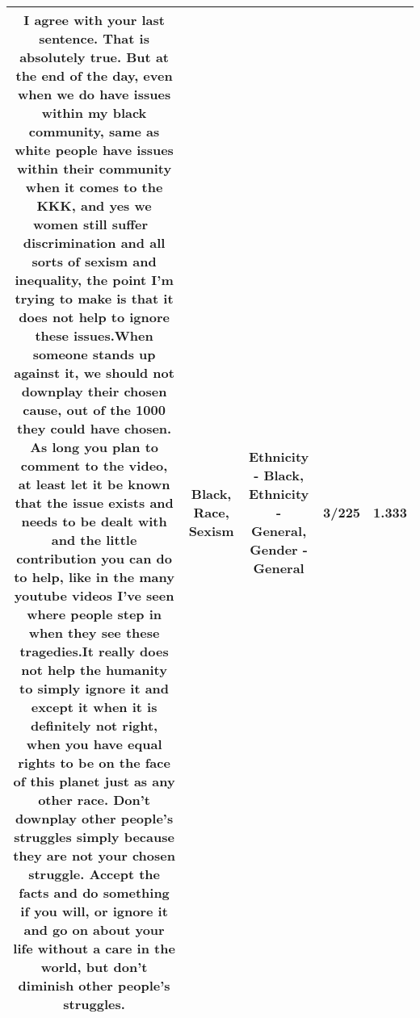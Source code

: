 \documentclass[11pt]{article}
\newlength\mylength
\begin{document}
\begin{center}
\begin{longtable}{|C{.65\mylength}|C{.30\mylength}|C{.12\mylength}|C{.12\mylength}|C{.12\mylength}|}
  \small I agree with your last sentence. That is absolutely true. But at the end of the day, even when we do have issues within my \textbf{black} community, same as white people have issues within their community when it comes to the KKK, and yes we women still suffer  discrimination and all sorts of \textbf{sexism} and inequality, the point I'm trying to make is that it does not help to ignore these issues.When someone stands up against it, we should not downplay their chosen cause, out of the 1000 they could have chosen. As long you plan to comment to the video, at least let it be known that the issue exists and needs to be dealt with and the little contribution you can do to help, like in the many youtube videos I've seen where people step in when they see these tragedies.It really does not help the humanity to simply ignore it and except it when it is definitely not right, when you have equal rights to be on the face of this planet just as any other \textbf{race}. Don't downplay other people's struggles simply because they are not your chosen struggle. Accept the facts and do something if you will, or ignore it and go on about your life without a care in the world, but don't diminish other people's struggles.\normalsize   & Black, Race, Sexism & Ethnicity - Black, Ethnicity - General, Gender - General & 3/225 & 1.333 \\  \hline

\end{longtable}
\end{center}
\end{document}
